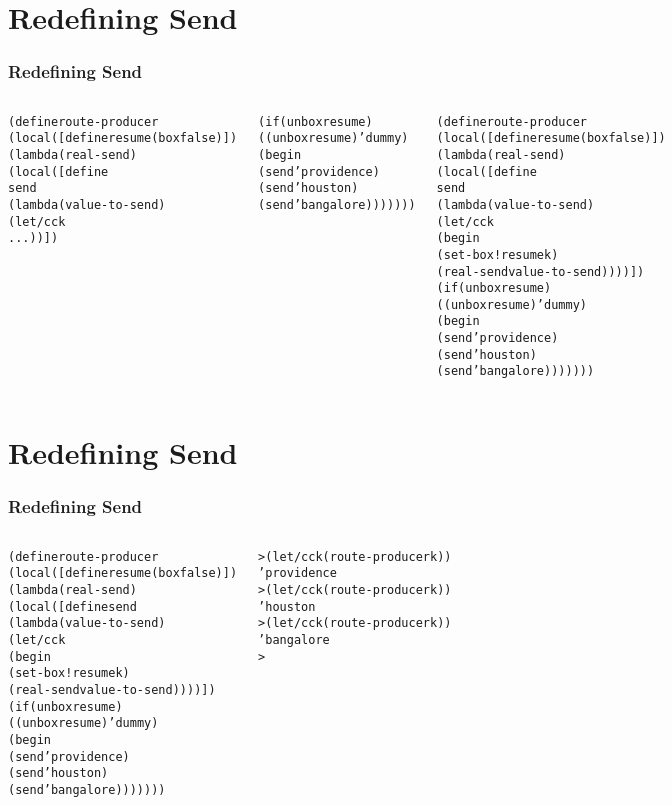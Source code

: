 \documentclass[slidestop,xcolor=pst,dvips]{beamer}
\newcommand{\sect}[1]{
\section{#1}
\begin{frame}[fragile]\frametitle{#1}
}
\begin{document}
\sect{Redefining Send}
\begin{columns}[t]
\begin{alltt}
(define route-producer
  (local ([define resume (box false)])
    (lambda (real-send)
      (local ([define 
                send 
                (lambda (value-to-send)
                  (let/cc k
                    ...))])


        (if (unbox resume)
            ((unbox resume) 'dummy)
            (begin
              (send 'providence)
              (send 'houston)
              (send 'bangalore)))))))
\end{alltt}
\begin{alltt}
(define route-producer
  (local ([define resume (box false)])
    (lambda (real-send)
      (local ([define 
                send 
                (lambda (value-to-send)
                  (let/cc k
                    (begin
                      (set-box! resume k)
                      (real-send value-to-send))))])
        (if (unbox resume)
            ((unbox resume) 'dummy)
            (begin
              (send 'providence)
              (send 'houston)
              (send 'bangalore)))))))

\end{alltt}
\end{columns}
\end{frame}

\sect{Redefining Send}
\begin{columns}[t]
\begin{alltt}
(define route-producer
  (local ([define resume (box false)])
    (lambda (real-send)
      (local ([define send 
                (lambda (value-to-send)
                  (let/cc k
                    (begin
                      (set-box! resume k)
                      (real-send value-to-send))))])
        (if (unbox resume)
            ((unbox resume) 'dummy)
            (begin
              (send 'providence)
              (send 'houston)
              (send 'bangalore)))))))
\end{alltt}
\begin{alltt}

> (let/cc k (route-producer k))
'providence
> (let/cc k (route-producer k))
'houston
> (let/cc k (route-producer k))
'bangalore
> 
\end{alltt}
\end{columns}
\end{frame}
\end{document}
